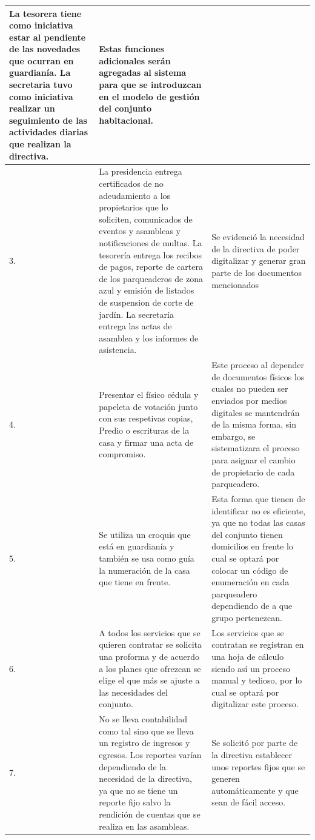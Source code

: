 \begin{footnotesize}
\begin{center}
\begin{longtable}[c]{|p{} |p{} |p{}|}
        La tesorera tiene como iniciativa estar al pendiente de las novedades que ocurran en guardianía.
       La secretaria tuvo como iniciativa realizar un seguimiento de las actividades diarias que realizan la directiva.
       & Estas funciones adicionales serán agregadas al sistema para que se introduzcan en el modelo de gestión del conjunto habitacional.\\
        \hline
        3. & La presidencia entrega certificados de no adeudamiento a los propietarios que lo soliciten, comunicados de eventos y asambleas y notificaciones de multas.
        La tesorería entrega los recibos de pagos, reporte de cartera de los parqueaderos de zona azul y emisión de listados de suspension de corte de jardín.
       La secretaría entrega las actas de asamblea y los informes de asistencia.
        & Se evidenció la necesidad de la directiva de poder digitalizar y generar gran parte de los documentos mencionados\\
        \hline
        4. & Presentar el físico cédula y papeleta de votación junto con sus respetivas copias, Predio o escrituras de la casa y firmar una acta de compromiso.
        & Este proceso al depender de documentos físicos los cuales no pueden ser enviados por medios digitales se mantendrán de la misma forma, sin embargo, se sistematizara el proceso para asignar el cambio de propietario de cada parqueadero.\\
        \hline
        5. & Se utiliza un croquis que está en guardianía y también se usa como guía la numeración de la casa que tiene en frente.
        & Esta forma que tienen de identificar no es eficiente, ya que no todas las casas del conjunto tienen domicilios en frente lo cual se optará por colocar un código de enumeración en cada parqueadero dependiendo de a que grupo pertenezcan.\\
        \hline
        6. & A todos los servicios que se quieren contratar se solicita una proforma y de acuerdo a los planes que ofrezcan se elige el que más se ajuste a las necesidades del conjunto.
        & Los servicios que se contratan se registran en una hoja de cálculo siendo así un proceso manual y tedioso, por lo cual se optará por digitalizar este proceso.\\
        \hline
        7. & No se lleva contabilidad como tal sino que se lleva un registro de ingresos y egresos.
        Los reportes varían dependiendo de la necesidad de la directiva, ya que no se tiene un reporte fijo salvo la rendición de cuentas que se realiza en las asambleas.
        & Se solicitó por parte de la directiva establecer unos reportes fijos que se generen automáticamente y que sean de fácil acceso.\\

\end{longtable}
\end{center}
\end{footnotesize}
